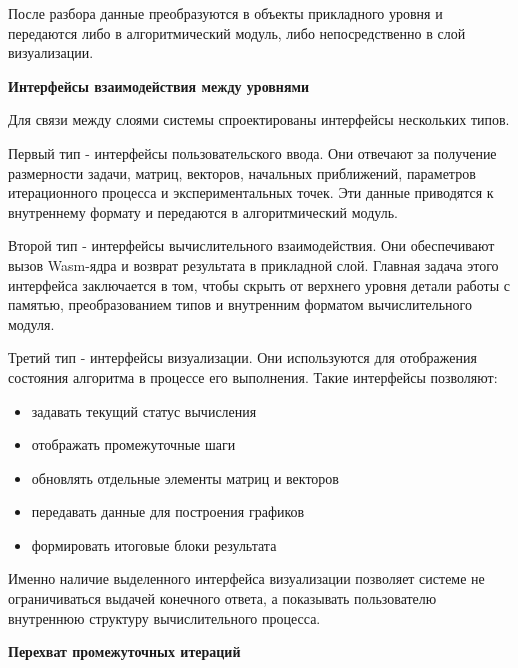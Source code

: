 \documentclass[12pt, oneside]{book}
\begin{document}
    \quad После разбора данные преобразуются в объекты прикладного уровня и передаются либо в алгоритмический модуль, либо непосредственно в слой визуализации.

    \vspace{0.5em}

    \textbf{\large Интерфейсы взаимодействия между уровнями}

    \vspace{0.5em}


    \quad Для связи между слоями системы спроектированы интерфейсы нескольких типов.
    
    \quad Первый тип - интерфейсы пользовательского ввода. Они отвечают за получение размерности задачи, матриц, векторов, начальных приближений, параметров итерационного процесса и экспериментальных точек. Эти данные приводятся к внутреннему формату и передаются в алгоритмический модуль.
    
    \quad Второй тип - интерфейсы вычислительного взаимодействия. Они обеспечивают вызов Wasm-ядра и возврат результата в прикладной слой. Главная задача этого интерфейса заключается в том, чтобы скрыть от верхнего уровня детали работы с памятью, преобразованием типов и внутренним форматом вычислительного модуля.
    
    \quad Третий тип - интерфейсы визуализации. Они используются для отображения состояния алгоритма в процессе его выполнения. Такие интерфейсы позволяют:

    \begin{itemize}
        \item задавать текущий статус вычисления
        \item отображать промежуточные шаги
        \item обновлять отдельные элементы матриц и векторов
        \item передавать данные для построения графиков
        \item формировать итоговые блоки результата
    \end{itemize}

    \quad Именно наличие выделенного интерфейса визуализации позволяет системе не ограничиваться выдачей конечного ответа, а показывать пользователю внутреннюю структуру вычислительного процесса.

    \vspace{0.5em}

    \textbf{\large Перехват промежуточных итераций}

    \vspace{0.5em}
\end{document}

